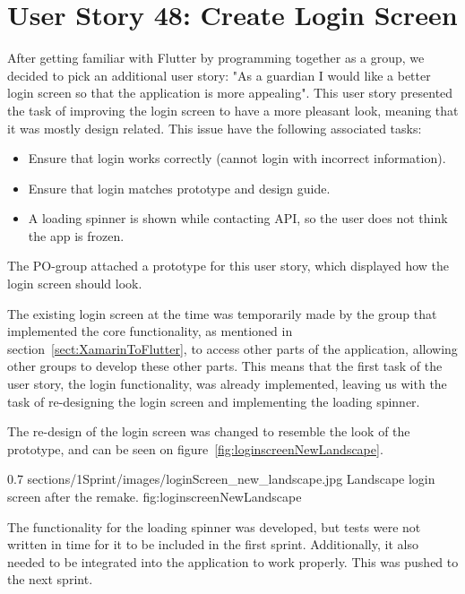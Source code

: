 \section{User Story 48: Create Login Screen}
\label{sect:LoginScreenFlutter}
After getting familiar with Flutter by programming together as a group, we decided to pick an additional user story:
"As a guardian I would like a better login screen so that the application is more appealing". This user story presented the task of improving the login screen to have a more pleasant look, meaning that it was mostly design related. 
This issue have the following associated tasks:

\begin{itemize}
    \item Ensure that login works correctly (cannot login with incorrect information).
    \item Ensure that login matches prototype and design guide.
    \item A loading spinner is shown while contacting API, so the user does not think the app is frozen.
\end{itemize}

The PO-group attached a prototype for this user story, which displayed how the login screen should look.

The existing login screen at the time was temporarily made by the group that implemented the core functionality, as mentioned in section~\ref{sect:XamarinToFlutter}, to access other parts of the application, allowing other groups to develop these other parts. 
This means that the first task of the user story, the login functionality, was already implemented, leaving us with the task of re-designing the login screen and implementing the loading spinner. 

The re-design of the login screen was changed to resemble the look of the prototype, and can be seen on figure~\ref{fig:loginscreenNewLandscape}.

        {0.7} %
        {sections/1Sprint/images/loginScreen_new_landscape.jpg} %
        {Landscape login screen after the remake.} %
        {fig:loginscreenNewLandscape} %

The functionality for the loading spinner was developed, but tests were not written in time for it to be included in the first sprint. Additionally, it also needed to be integrated into the application to work properly. This was pushed to the next sprint.


